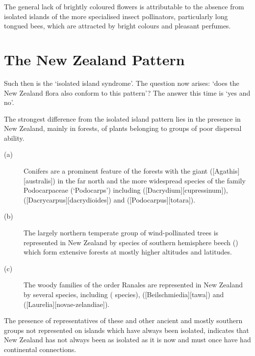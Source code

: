 The general lack of brightly coloured flowers is attributable to the absence from isolated islands of the more specialised insect pollinators, particularly long tongued bees, which are attracted by bright colours and pleasant perfumes.

\section{The New Zealand Pattern}

Such then is the `isolated island syndrome'.
The question now arises: `does the New Zealand flora also conform to this pattern'? The answer this time is `yes and no'.

The strongest difference from the isolated island pattern lies in the presence in New Zealand, mainly in forests, of plants belonging to groups of poor dispersal ability.

\begin{description}
\item[{(a)}]Conifers are a prominent feature of the forests with the giant  ([Agathis][australis]) in the far north and the more widespread species of the family Podocarpaceae (`Podocarps') including  ([Dacrydium][cupressinum]),  ([Dacrycarpus][dacrydioides]) and  ([Podocarpus][totara]).
\item[{(b)}]The largely northern temperate group of wind-pollinated trees is represented in New Zealand by species of southern hemisphere beech () which form extensive forests at mostly higher altitudes and latitudes.
\item[{(c)}]The woody families of the order Ranales are represented in New Zealand by several species, including  ( species),  ([Beilschmiedia][tawa]) and  ([Laurelia][novae-zelandiae]).
\end{description}

The presence of representatives of these and other ancient and mostly southern groups not represented on islands which have always been isolated, indicates that New Zealand has not always been as isolated as it is now and must once have had continental connections.

